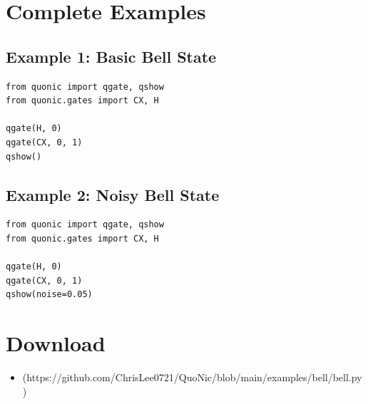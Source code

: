 \documentclass[12pt,a4paper]{article}
\begin{document}
\section{Complete Examples}

\subsection{Example 1: Basic Bell State}

\begin{verbatim}
from quonic import qgate, qshow
from quonic.gates import CX, H

qgate(H, 0)
qgate(CX, 0, 1)
qshow()
\end{verbatim}

\subsection{Example 2: Noisy Bell State}

\begin{verbatim}
from quonic import qgate, qshow
from quonic.gates import CX, H

qgate(H, 0)
qgate(CX, 0, 1)
qshow(noise=0.05)
\end{verbatim}

\section{Download}

\begin{itemize}
  \item [bell.py](https://github.com/ChrisLee0721/QuoNic/blob/main/examples/bell/bell.py)
\end{itemize}
\end{document}
